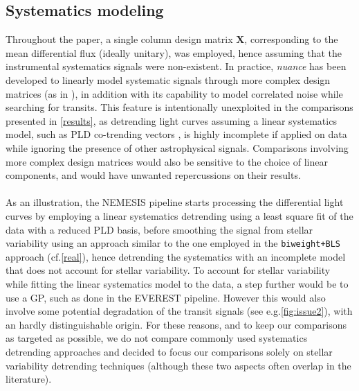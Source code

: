 \documentclass[modern]{aastex631}
\newcommand{\nuancemethod}{\textit{nuance}}
\begin{document}
\subsection{Systematics modeling}\label{systematics}
Throughout the paper, a single column design matrix $\bm{X}$, corresponding to the mean differential flux (ideally unitary), was employed, hence assuming that the instrumental systematics signals were non-existent. In practice, \nuancemethod{} has been developed to linearly model systematic signals through more complex design matrices (as in \citealt{foreman2016}), in addition with its capability to model correlated noise while searching for transits. This feature is intentionally unexploited in the comparisons presented in \autoref{results}, as detrending light curves assuming a linear systematics model, such as PLD co-trending vectors \citep{pld}, is highly incomplete if applied on data while ignoring the presence of other astrophysical signals. Comparisons involving more complex design matrices would also be sensitive to the choice of linear components, and would have unwanted repercussions on their results.\\\\
As an illustration, the NEMESIS pipeline \citep{nemesis} starts processing the differential light curves by employing a linear systematics detrending using a least square fit of the data with a reduced PLD basis, before smoothing the signal from stellar variability using an approach similar to the one employed in the \texttt{biweight+BLS} approach (cf.\;\autoref{real}), hence detrending the systematics with an incomplete model that does not account for stellar variability. To account for stellar variability while fitting the linear systematics model to the data, a step further would be to use a GP, such as done in the EVEREST \citep{everest2} pipeline. However this would also involve some potential degradation of the transit signals (see e.g.\;\autoref{fig:issue2}), with an hardly distinguishable origin. For these reasons, and to keep our comparisons as targeted as possible, we do not compare commonly used systematics detrending approaches and decided to focus our comparisons solely on stellar variability detrending techniques (although these two aspects often overlap in the literature).\\\\
\end{document}
